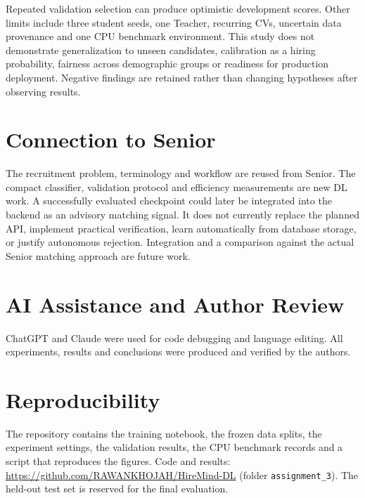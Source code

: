 \documentclass[11pt]{article}
\begin{document}
Repeated validation selection can produce optimistic development scores. Other limits include three student seeds, one Teacher, recurring CVs, uncertain data provenance and one CPU benchmark environment. This study does not demonstrate generalization to unseen candidates, calibration as a hiring probability, fairness across demographic groups or readiness for production deployment. Negative findings are retained rather than changing hypotheses after observing results.

\section{Connection to Senior}
The recruitment problem, terminology and workflow are reused from Senior. The compact classifier, validation protocol and efficiency measurements are new DL work. A successfully evaluated checkpoint could later be integrated into the backend as an advisory matching signal. It does not currently replace the planned API, implement practical verification, learn automatically from database storage, or justify autonomous rejection. Integration and a comparison against the actual Senior matching approach are future work.

\section*{AI Assistance and Author Review}
ChatGPT and Claude were used for code debugging and language editing. All experiments, results and conclusions were produced and verified by the authors.

\section*{Reproducibility}
The repository contains the training notebook, the frozen data splits, the experiment settings, the validation results, the CPU benchmark records and a script that reproduces the figures. Code and results: \url{https://github.com/RAWANKHOJAH/HireMind-DL} (folder \texttt{assignment\_3}). The held-out test set is reserved for the final evaluation.
\end{document}
